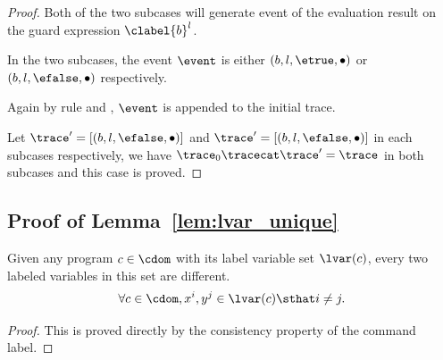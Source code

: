 \begin{proof}
  Both of the two  subcases will generate event of the evaluation result on the guard expression
  $\clabel{b}^l$.

  In the two subcases,
  the event $\event $ is either $(b, l, \etrue, \bullet)$ or $(b, l, \efalse, \bullet)$ respectively.

  Again by rule  and , $\event $ is appended to the initial trace.

  Let $\trace' =  [(b, l, \efalse, \bullet)]$
  and $\trace' =  [(b, l, \efalse, \bullet)]$ in each subcases respectively,
  we have 
  $\trace_0 \tracecat \trace' = \trace$ in both subcases and this case is proved.
\end{proof}

\subsection{Proof of Lemma~\ref{lem:lvar_unique}}
\label{apdx:lvar_unique}
\begin{lemma}
  Given any program $c \in \cdom$ with its label variable set $\lvar(c)$,
  every two labeled variables in this set are different.
  \[
    \forall c \in \cdom, x^i, y^j \in \lvar(c) \sthat i \neq j.
    \]
\end{lemma}
\begin{proof}
  This is proved directly by the consistency property of the command label.
\end{proof}


